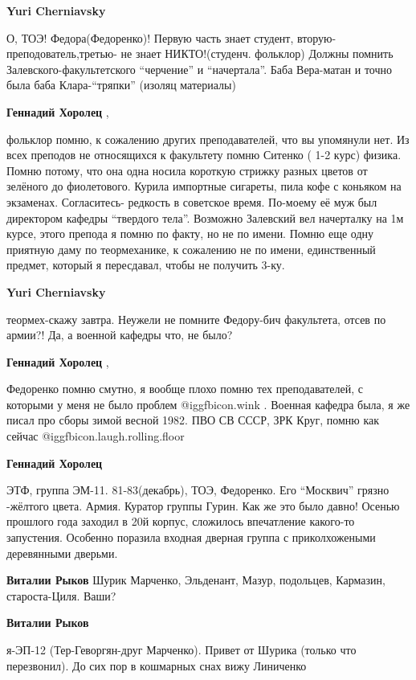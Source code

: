\begin{itemize}
\begin{itemize}
\begin{itemize}
\textbf{Yuri Cherniavsky} 

О, ТОЭ! Федора(Федоренко)! Первую часть знает студент,
вторую-преподователь,третью- не знает НИКТО!(студенч. фольклор) Должны помнить
Залевского-факультетского \enquote{черчение} и \enquote{начертала}. Баба Вера-матан и точно
была баба Клара-\enquote{тряпки} (изоляц материалы)

\textbf{Геннадий Хоролец} , 

фольклор помню, к сожалению других преподавателей, что вы упомянули нет. Из
всех преподов не относящихся к факультету помню Ситенко ( 1-2 курс) физика.
Помню потому, что она одна носила короткую стрижку разных цветов от зелёного до
фиолетового. Курила импортные сигареты, пила кофе с коньяком на экзаменах.
Согласитесь- редкость в советское время. По-моему её муж был директором кафедры
\enquote{твердого тела}. Возможно Залевский вел начерталку на 1м курсе, этого препода
я помню по факту, но не по имени. Помню еще одну приятную даму по теормеханике,
к сожалению не по имени, единственный предмет, который я пересдавал, чтобы не
получить 3-ку.

\textbf{Yuri Cherniavsky} 

теормех-скажу завтра. Неужели не помните Федору-бич
факультета, отсев по армии?! Да, а военной кафедры что, не было?

\textbf{Геннадий Хоролец} , 

Федоренко помню смутно, я вообще плохо помню тех преподавателей, с которыми у
меня не было проблем  @igg{fbicon.wink} . Военная кафедра была, я же писал про сборы зимой
весной 1982. ПВО СВ СССР, ЗРК Круг, помню как сейчас  @igg{fbicon.laugh.rolling.floor} 


\textbf{Геннадий Хоролец} 

ЭТФ, группа ЭМ-11. 81-83(декабрь), ТОЭ, Федоренко. Его \enquote{Москвич} грязно -жёлтого
цвета. Армия. Куратор группы Гурин. Как же это было давно! Осенью прошлого года
заходил в 20й корпус, сложилось впечатление какого-то запустения. Особенно
поразила входная дверная группа с приколхожеными деревянными дверьми.

\textbf{Виталии Рыков} Шурик Марченко, Эльденант, Мазур, подольцев, Кармазин, староста-Циля. Ваши?

\textbf{Виталии Рыков} 

я-ЭП-12 (Тер-Геворгян-друг Марченко). Привет от Шурика (только что перезвонил). До
сих пор в кошмарных снах вижу Линиченко


\end{itemize}
\end{itemize}
\end{itemize}

